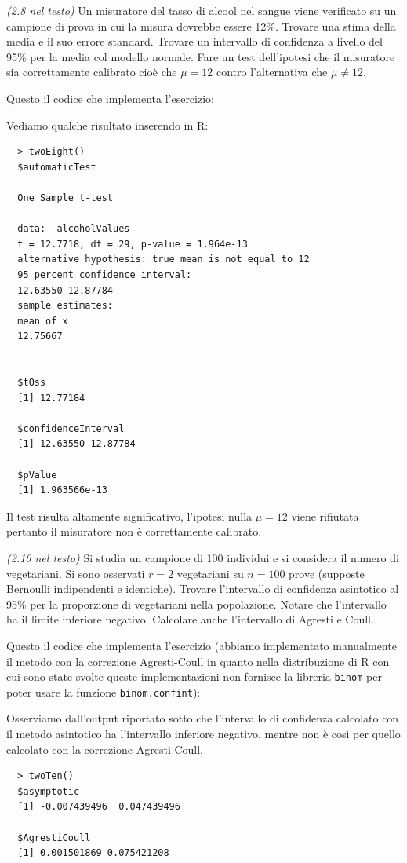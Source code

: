 \begin{exercise}{\emph{(2.8 nel testo)}}
  Un misuratore del tasso di alcool nel sangue viene verificato su un
  campione di prova in cui la misura dovrebbe essere 12\%. Trovare una
  stima della media e il suo errore standard. Trovare un intervallo di
  confidenza a livello del 95\% per la media col modello normale. Fare
  un test dell'ipotesi che il misuratore sia correttamente calibrato
  cio\`e che $\mu = 12$ contro l'alternativa che $\mu \not = 12$.
\end{exercise}
Questo il codice che implementa l'esercizio:

Vediamo qualche risultato inserendo in R:
\begin{lstlisting}
  > twoEight()
  $automaticTest

  One Sample t-test

  data:  alcoholValues 
  t = 12.7718, df = 29, p-value = 1.964e-13
  alternative hypothesis: true mean is not equal to 12 
  95 percent confidence interval:
  12.63550 12.87784 
  sample estimates:
  mean of x 
  12.75667 


  $tOss
  [1] 12.77184

  $confidenceInterval
  [1] 12.63550 12.87784

  $pValue
  [1] 1.963566e-13
\end{lstlisting}
Il test risulta altamente significativo, l'ipotesi nulla $\mu=12$
viene rifiutata pertanto il misuratore non \`e correttamente
calibrato.


\begin{exercise}{\emph{(2.10 nel testo)}}
  Si studia un campione di 100 individui e si considera il numero di
  vegetariani.  Si sono osservati $r = 2$ vegetariani su $n = 100$
  prove (supposte Bernoulli indipendenti e identiche). Trovare
  l'intervallo di confidenza asintotico al 95\% per la proporzione di
  vegetariani nella popolazione. Notare che l'intervallo ha il limite
  inferiore negativo. Calcolare anche l'intervallo di Agresti e Coull.
\end{exercise}
Questo il codice che implementa l'esercizio (abbiamo implementato
manualmente il metodo con la correzione Agresti-Coull in quanto nella
distribuzione di R con cui sono state svolte queste implementazioni
non fornisce la libreria \texttt{binom} per poter usare la funzione
\texttt{binom.confint}):


Osserviamo dall'output riportato sotto che l'intervallo di confidenza
calcolato con il metodo asintotico ha l'intervallo inferiore negativo,
mentre non \`e cos\`i per quello calcolato con la correzione
Agresti-Coull. 
\begin{lstlisting}
  > twoTen()
  $asymptotic
  [1] -0.007439496  0.047439496

  $AgrestiCoull
  [1] 0.001501869 0.075421208
\end{lstlisting}

